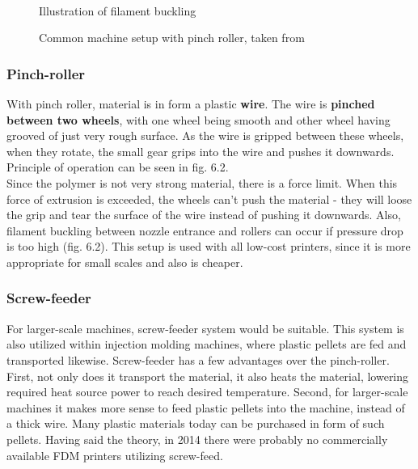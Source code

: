 \documentclass[a4paper, twoside, 11pt]{report}
\begin{document}
\begin{figure}[h]
\begin{minipage}[b]{0.45\textwidth}
  \end{minipage}
  \\[5pt]
  \begin{minipage}[t]{0.45\textwidth}
    \caption{Illustration of filament buckling \cite{FDMReview}}
  \end{minipage}
  \hfill
  \begin{minipage}[t]{0.45\textwidth}
    \caption{Common machine setup with pinch roller, taken from \cite{MachineDesign}}
  \end{minipage}
\end{figure}

\subsubsection{Pinch-roller}
With pinch roller, material is in form a plastic \textbf{wire}. The wire is \textbf{pinched between two wheels}, with one wheel being smooth and other wheel having grooved of just very rough surface. As the wire is gripped between these wheels, when they rotate, the small gear grips into the wire and pushes it downwards. Principle of operation can be seen in fig. 6.2.\\
	Since the polymer is not very strong material, there is a force limit. When this force of extrusion is exceeded, the wheels can't push the material - they will loose the grip and tear the surface of the wire instead of pushing it downwards. Also, filament buckling between nozzle entrance and rollers can occur if pressure drop is too high (fig. 6.2).  This setup is used with all low-cost printers, since it is more appropriate for small scales and also is cheaper.
\subsubsection{Screw-feeder}
For larger-scale machines, screw-feeder system would be suitable. This system is also utilized within injection molding machines, where plastic pellets are fed and transported likewise. Screw-feeder has a few advantages over the pinch-roller. First, not only does it transport the material, it also heats the material, lowering required heat source power to reach desired temperature. Second, for larger-scale machines it makes more sense to feed plastic pellets into the machine, instead of a thick wire. Many plastic materials today can be purchased in form of such pellets. Having said the theory, in 2014 there were probably no commercially available FDM printers utilizing screw-feed. \cite[p. 193]{FDMReview}
\end{document}
